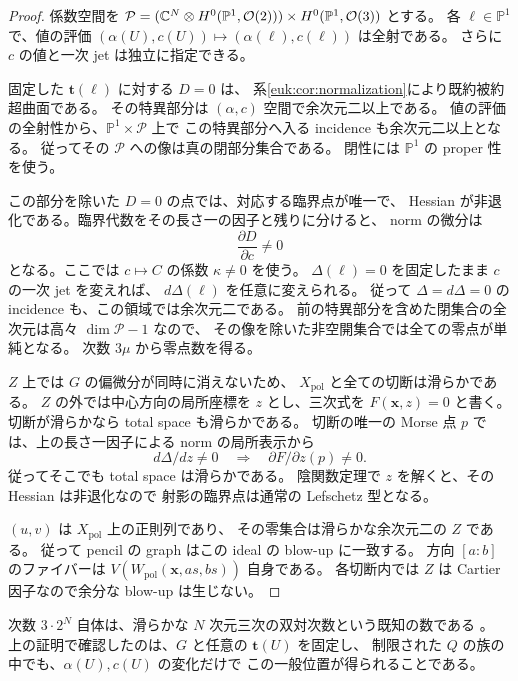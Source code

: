 \begin{proof}
係数空間を
$\mathcal P=(\mathbb C^N\otimes H^0(\mathbb P^1,\mathcal O(2)))
\times H^0(\mathbb P^1,\mathcal O(3))$ とする。
各 $\ell\in\mathbb P^1$ で、値の評価
$(\alpha(U),c(U))\mapsto(\alpha(\ell),c(\ell))$ は全射である。
さらに $c$ の値と一次 jet は独立に指定できる。

固定した $\mathbf t(\ell)$ に対する $D=0$ は、
系\ref{euk:cor:normalization}により既約被約超曲面である。
その特異部分は $(\alpha,c)$ 空間で余次元二以上である。
値の評価の全射性から、$\mathbb P^1\times\mathcal P$ 上で
この特異部分へ入る incidence も余次元二以上となる。
従ってその $\mathcal P$ への像は真の閉部分集合である。
閉性には $\mathbb P^1$ の proper 性を使う。

この部分を除いた $D=0$ の点では、対応する臨界点が唯一で、
Hessian が非退化である。臨界代数をその長さ一の因子と残りに分けると、
norm の微分は
\[
                   \frac{\partial D}{\partial c}\ne0
\]
となる。ここでは $c\mapsto C$ の係数 $\kappa\ne0$ を使う。
$\Delta(\ell)=0$ を固定したまま $c$ の一次 jet を変えれば、
$d\Delta(\ell)$ を任意に変えられる。
従って $\Delta=d\Delta=0$ の incidence も、この領域では余次元二である。
前の特異部分を含めた閉集合の全次元は高々 $\dim\mathcal P-1$ なので、
その像を除いた非空開集合では全ての零点が単純となる。
次数 $3\mu$ から零点数を得る。

$Z$ 上では $G$ の偏微分が同時に消えないため、
$X_{\mathrm{pol}}$ と全ての切断は滑らかである。
$Z$ の外では中心方向の局所座標を $z$ とし、三次式を
$F(\mathbf x,z)=0$ と書く。切断が滑らかなら total space も滑らかである。
切断の唯一の Morse 点 $p$ では、上の長さ一因子による norm の局所表示から
\[
 d\Delta/dz\ne0\quad\Longrightarrow\quad
                       \partial F/\partial z(p)\ne0.
\]
従ってそこでも total space は滑らかである。
陰関数定理で $z$ を解くと、その Hessian は非退化なので
射影の臨界点は通常の Lefschetz 型となる。

$(u,v)$ は $X_{\mathrm{pol}}$ 上の正則列であり、
その零集合は滑らかな余次元二の $Z$ である。
従って pencil の graph はこの ideal の blow-up に一致する。
方向 $[a:b]$ のファイバーは
$V(W_{\mathrm{pol}}(\mathbf x,as,bs))$ 自身である。
各切断内では $Z$ は Cartier 因子なので余分な blow-up は生じない。
\end{proof}

次数 $3\cdot2^N$ 自体は、滑らかな $N$ 次元三次の双対次数という既知の数である
\cite[Section~7.1, Example~7.4]{CMOTevelevDuality}。
上の証明で確認したのは、$G$ と任意の $\mathbf t(U)$ を固定し、
制限された $Q$ の族の中でも、$\alpha(U),c(U)$ の変化だけで
この一般位置が得られることである。

